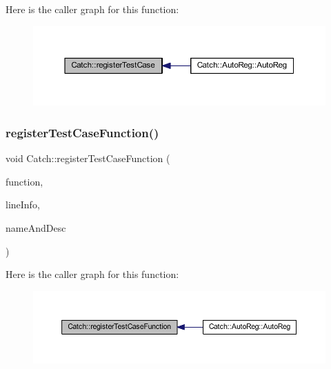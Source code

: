 Here is the caller graph for this function\+:\nopagebreak
\begin{figure}[H]
\begin{center}
\leavevmode
\includegraphics[width=350pt]{namespace_catch_a9a59d681cc327a33c280796561dfe258_icgraph}
\end{center}
\end{figure}
\hypertarget{namespace_catch_a220159aeff47f9c5231e893f2abbc643}{}\label{namespace_catch_a220159aeff47f9c5231e893f2abbc643} 
\subsubsection{\texorpdfstring{register\+Test\+Case\+Function()}{registerTestCaseFunction()}}
{\footnotesize\ttfamily void Catch\+::register\+Test\+Case\+Function (\begin{DoxyParamCaption}\item[{\hyperlink{namespace_catch_a26414f52d0835939fae52aadd27e6257}{Test\+Function}}]{function,  }\item[{\hyperlink{struct_catch_1_1_source_line_info}{Source\+Line\+Info} const \&}]{line\+Info,  }\item[{\hyperlink{struct_catch_1_1_name_and_desc}{Name\+And\+Desc} const \&}]{name\+And\+Desc }\end{DoxyParamCaption})}

Here is the caller graph for this function\+:\nopagebreak
\begin{figure}[H]
\begin{center}
\leavevmode
\includegraphics[width=350pt]{namespace_catch_a220159aeff47f9c5231e893f2abbc643_icgraph}
\end{center}
\end{figure}
\hypertarget{namespace_catch_afe4e6770da547e43e9e4eeaa05f946ea}{}\label{namespace_catch_afe4e6770da547e43e9e4eeaa05f946ea} 
